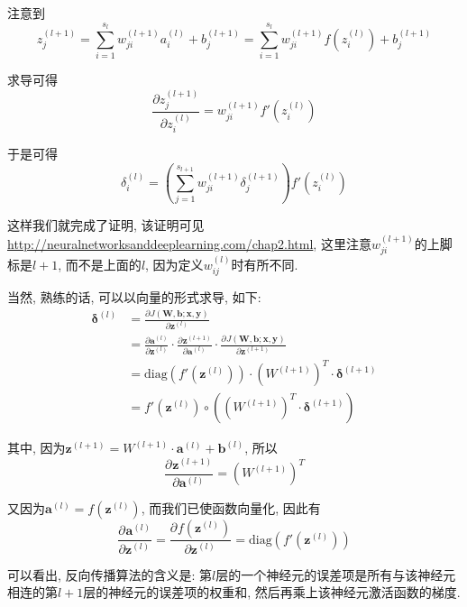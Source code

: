 \documentclass[a4paper,UTF8]{ctexart}
\theoremstyle{plain} \newtheorem{theorem}{定理}[section]
\theoremstyle{plain} \newtheorem{definition}{定义}[section]
\theoremstyle{plain} \newtheorem{lemma}{引理}[section]
\theoremstyle{plain} \newtheorem{proposition}{命题}[section]
\theoremstyle{plain} \newtheorem{example}{例}[section]
\theoremstyle{plain} \newtheorem{remark}{注}[section]
\theoremstyle{plain} \newtheorem{corollary}{推论}[section]
\newcommand{\p}[3]{\frac{\partial^{#1}#2}{\partial{#3}^{#1}}}  %
\begin{document}
注意到
\begin{equation*}
z_{j}^{(l+1)} = \sum_{i=1}^{s_l} w_{ji}^{(l+1)} a_{i}^{(l)} + b_{j}^{(l+1)} = \sum_{i=1}^{s_l} w_{ji}^{(l+1)} f(z_{i}^{(l)}) + b_{j}^{(l+1)}
\end{equation*}

求导可得
\begin{equation*}
\frac{\partial z_{j}^{(l+1)}}{\partial z_{i}^{(l)}} = w_{ji}^{(l+1)} f'(z_{i}^{(l)})
\end{equation*}

于是可得
\begin{equation*}
\delta_{i}^{(l)} = \left( \sum_{j=1}^{s_{l+1}} w_{ji}^{(l+1)} \delta_{j}^{(l+1)} \right) f'(z_{i}^{(l)})
\end{equation*}

这样我们就完成了证明, 该证明可见\url{http://neuralnetworksanddeeplearning.com/chap2.html}, 这里注意$w_{ji}^{(l + 1)}$的上脚标是$l + 1$, 而不是上面的$l$, 因为定义$w_{ij}^{(l)}$时有所不同.

当然, 熟练的话, 可以以向量的形式求导, 如下:
\begin{align*}
\bm{\delta}^{(l)} & = \frac{\partial J(\bm{W},\bm{b};\bm{x},\bm{y})}{\partial \bm{z}^{(l)}} \\ 
& = \frac{\partial \bm{a}^{(l)}}{\partial \bm{z}^{(l)}} \cdot \p{}{\bm{z}^{(l+1)}}{\bm{a}^{(l)}} \cdot \p{}{J(\bm{W},\bm{b};\bm{x},\bm{y})}{\bm{z}^{(l+1)}} \\ 
& = \mathrm{diag}(f'(\bm{z}^{(l)})) \cdot (W^{(l+1)})^{T} \cdot \bm{\delta}^{(l+1)} \\ 
& = f'(\bm{z}^{(l)}) \circ \left( (W^{(l+1)})^{T} \cdot \bm{\delta}^{(l+1)} \right)
\end{align*}

其中, 因为$\bm{z}^{(l+1)} = W^{(l+1)} \cdot \bm{a}^{(l)} + \bm{b}^{(l)}$, 所以
\begin{equation*}
\p{}{\bm{z}^{(l+1)}}{\bm{a}^{(l)}} = (W^{(l+1)})^{T}
\end{equation*}

又因为$\bm{a}^{(l)} = f(\bm{z}^{(l)})$, 而我们已使函数向量化, 因此有
\begin{equation*}
\p{}{\bm{a}^{(l)}}{\bm{z}^{(l)}} = \p{}{f(\bm{z}^{(l)})}{\bm{z}^{(l)}} = \mathrm{diag} (f'(\bm{z}^{(l)}))
\end{equation*}

可以看出, 反向传播算法的含义是: 第$l$层的一个神经元的误差项是所有与该神经元相连的第$l + 1$层的神经元的误差项的权重和, 然后再乘上该神经元激活函数的梯度.
\end{document}
